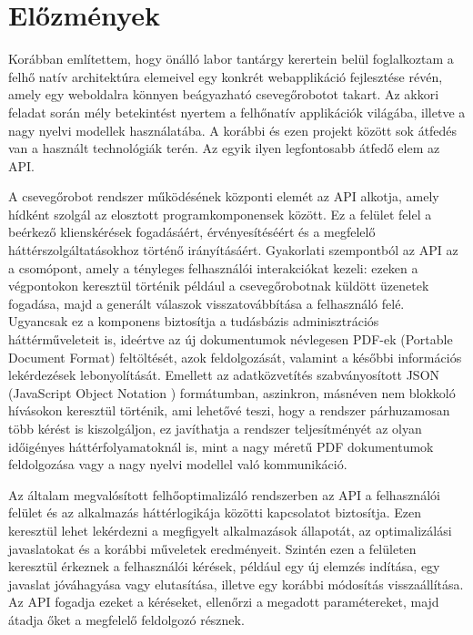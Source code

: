 \chapter{Előzmények}
Korábban említettem, hogy önálló labor tantárgy kerertein belül foglalkoztam
a felhő natív architektúra elemeivel egy konkrét webapplikáció fejlesztése révén,
amely egy weboldalra könnyen beágyazható csevegőrobotot takart. Az akkori
feladat során mély betekintést nyertem a felhőnatív applikációk világába, illetve
a nagy nyelvi modellek használatába. A korábbi és ezen projekt között sok átfedés
van a használt technológiák terén. Az egyik ilyen legfontosabb átfedő elem az API.

A csevegőrobot rendszer működésének központi elemét az API alkotja,
amely hídként szolgál az elosztott programkomponensek között.
Ez a felület felel a beérkező klienskérések fogadásáért, érvényesítéséért és a 
megfelelő háttérszolgáltatásokhoz történő irányításáért. 
Gyakorlati szempontból az API az a csomópont, amely a tényleges 
felhasználói interakciókat kezeli: ezeken a végpontokon keresztül történik például a 
csevegőrobotnak küldött üzenetek fogadása,
majd a generált válaszok visszatovábbítása a felhasználó felé. Ugyancsak ez a komponens
biztosítja a tudásbázis adminisztrációs háttérműveleteit is, ideértve az új dokumentumok
névlegesen PDF-ek (Portable Document Format) feltöltését, azok feldolgozását, valamint a 
későbbi információs lekérdezések lebonyolítását.
Emellett az adatközvetítés szabványosított JSON (JavaScript Object Notation ) formátumban,
aszinkron, másnéven nem blokkoló hívásokon keresztül történik, ami lehetővé teszi, hogy a rendszer
párhuzamosan több kérést is kiszolgáljon, ez
javíthatja a rendszer teljesítményét az olyan időigényes háttérfolyamatoknál is, 
mint a nagy méretű PDF dokumentumok feldolgozása vagy a nagy nyelvi modellel való 
kommunikáció.

Az általam megvalósított felhőoptimalizáló rendszerben az API a felhasználói felület
és az alkalmazás háttérlogikája közötti kapcsolatot 
biztosítja. Ezen keresztül lehet lekérdezni a megfigyelt alkalmazások állapotát, 
az optimalizálási javaslatokat és a korábbi műveletek eredményeit. Szintén ezen 
a felületen keresztül érkeznek a felhasználói kérések, például egy új elemzés indítása,
egy javaslat jóváhagyása vagy elutasítása, illetve egy korábbi módosítás visszaállítása.
Az API fogadja ezeket a kéréseket, ellenőrzi a megadott paramétereket,
majd átadja őket a megfelelő feldolgozó résznek.

